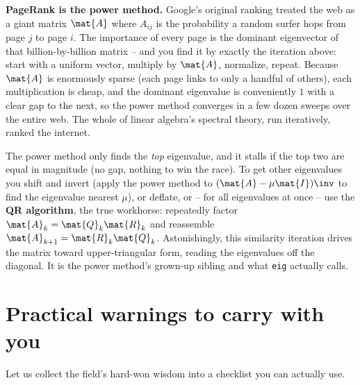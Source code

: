 \begin{applicationbox}
\textbf{PageRank is the power method.} Google's original ranking treated the web as a
giant matrix $\mat{A}$ where $A_{ij}$ is the probability a random surfer hops from page
$j$ to page $i$. The importance of every page is the dominant eigenvector of that
billion-by-billion matrix -- and you find it by exactly the iteration above: start with
a uniform vector, multiply by $\mat{A}$, normalize, repeat. Because $\mat{A}$ is
enormously sparse (each page links to only a handful of others), each multiplication is
cheap, and the dominant eigenvalue is conveniently $1$ with a clear gap to the next, so
the power method converges in a few dozen sweeps over the entire web. The whole of
linear algebra's spectral theory, run iteratively, ranked the internet.
\end{applicationbox}

\begin{remark}
The power method only finds the \emph{top} eigenvalue, and it stalls if the top two are
equal in magnitude (no gap, nothing to win the race). To get other eigenvalues you
shift and invert (apply the power method to $(\mat{A}-\mu\mat{I})\inv$ to find the
eigenvalue nearest $\mu$), or deflate, or -- for all eigenvalues at once -- use the
\textbf{QR algorithm}, the true workhorse: repeatedly factor $\mat{A}_k=\mat{Q}_k\mat{R}_k$
and reassemble $\mat{A}_{k+1}=\mat{R}_k\mat{Q}_k$. Astonishingly, this similarity
iteration drives the matrix toward upper-triangular form, reading the eigenvalues off
the diagonal. It is the power method's grown-up sibling and what \texttt{eig} actually
calls.
\end{remark}

\section{Practical warnings to carry with you}

Let us collect the field's hard-won wisdom into a checklist you can actually use.

